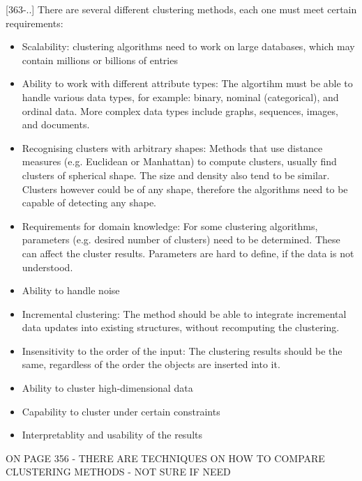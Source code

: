 \textcite{han2011data}[363-..]
There are several different clustering methods, each one must meet certain requirements:
\begin{itemize}
  \item Scalability: clustering algorithms need to work on large databases, which may contain millions or billions of entries
  \item Ability to work with different attribute types: The algortihm must be able to handle various data types, for example: binary, nominal (categorical), and ordinal data. More complex data types include graphs, sequences, images, and documents.
  \item Recognising clusters with arbitrary shapes: Methods that use distance measures (e.g. Euclidean or Manhattan) to compute clusters, usually find clusters of spherical shape. The size and density also tend to be similar. Clusters however could be of any shape, therefore the algorithms need to be capable of detecting any shape.
  \item Requirements for domain knowledge: For some clustering algorithms, parameters (e.g. desired number of clusters) need to be determined. These can affect the cluster results. Parameters are hard to define, if the data is not understood.
  \item Ability to handle noise
  \item Incremental clustering: The method should be able to integrate incremental data updates into existing structures, without recomputing the clustering.
  \item Insensitivity to the order of the input: The clustering results should be the same, regardless of the order the objects are inserted into it.
  \item Ability to cluster high-dimensional data %
  \item Capability to cluster under certain constraints %
  \item Interpretablity and usability of the results
\end{itemize}

ON PAGE 356 - THERE ARE TECHNIQUES ON HOW TO COMPARE CLUSTERING METHODS - NOT SURE IF NEED